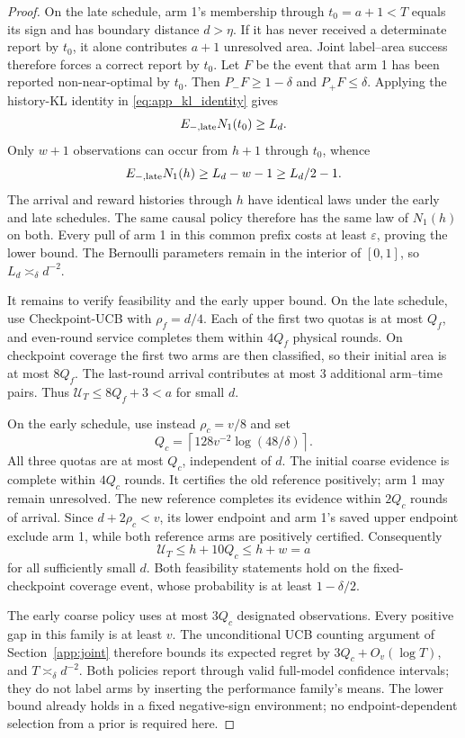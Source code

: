 \documentclass[11pt]{article}
\theoremstyle{remark}
\begin{document}
\begin{proof}
On the late schedule, arm 1's membership through $t_0=a+1<T$ equals its
sign and has boundary distance $d>\eta$. If it has never received a
determinate report by $t_0$, it alone contributes $a+1$ unresolved area.
Joint label--area success therefore forces a correct report by $t_0$.
Let $F$ be the event that arm 1 has been reported non-near-optimal by
$t_0$. Then $P_-F\ge1-\delta$ and $P_+F\le\delta$. Applying the
history-KL identity in \eqref{eq:app_kl_identity} gives
\[
 E_{-,\rm late}N_1(t_0)\ge L_d.
\]
Only $w+1$ observations can occur from $h+1$ through $t_0$, whence
\[
 E_{-,\rm late}N_1(h)\ge L_d-w-1\ge L_d/2-1.
\]
The arrival and reward histories through $h$ have identical laws under
the early and late schedules. The same causal policy therefore has the
same law of $N_1(h)$ on both. Every pull of arm 1 in this common prefix
costs at least $\varepsilon$, proving the lower bound. The Bernoulli
parameters remain in the interior of $[0,1]$, so
$L_d\asymp_\delta d^{-2}$.

It remains to verify feasibility and the early upper bound. On the late
schedule, use Checkpoint-UCB with $\rho_f=d/4$. Each of the first two
quotas is at most $Q_f$, and even-round service completes them within
$4Q_f$ physical rounds. On checkpoint coverage the first two arms are
then classified, so their initial area is at most $8Q_f$. The last-round
arrival contributes at most 3 additional arm--time pairs. Thus
$\mathcal U_T\le8Q_f+3<a$ for small $d$.

On the early schedule, use instead $\rho_c=v/8$ and set
\[
 Q_c=\left\lceil128v^{-2}\log(48/\delta)\right\rceil.
\]
All three quotas are at most $Q_c$, independent of $d$. The initial
coarse evidence is complete within $4Q_c$ rounds. It certifies the old
reference positively; arm 1 may remain unresolved. The new reference
completes its evidence within $2Q_c$ rounds of arrival. Since
$d+2\rho_c<v$, its lower endpoint and arm 1's saved upper endpoint
exclude arm 1, while both reference arms are positively certified.
Consequently
\[
 \mathcal U_T\le h+10Q_c\le h+w=a
\]
for all sufficiently small $d$. Both feasibility statements hold on
the fixed-checkpoint coverage event, whose probability is at least
$1-\delta/2$.

The early coarse policy uses at most $3Q_c$ designated observations.
Every positive gap in this family is at least $v$. The unconditional
UCB counting argument of Section~\ref{app:joint} therefore bounds its
expected regret by $3Q_c+O_v(\log T)$, and $T\asymp_\delta d^{-2}$.
Both policies report through valid full-model confidence intervals;
they do not label arms by inserting the performance family's means.
The lower bound already holds in a fixed negative-sign environment;
no endpoint-dependent selection from a prior is required here.
\end{proof}
\end{document}
